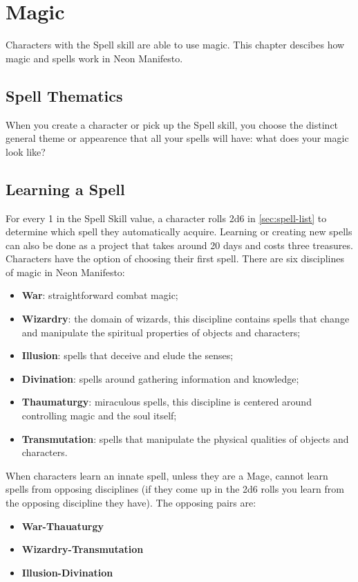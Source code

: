 \newpage
\section{Magic}
\label{sec:magic}

Characters with the Spell skill are able to use magic. This chapter descibes how magic and spells work in Neon Manifesto.

\subsection{Spell Thematics}
When you create a character or pick up the Spell skill, you choose the distinct general theme or appearence that all your spells will have: what does your magic look like?

\subsection{Learning a Spell}
For every 1 in the Spell Skill value, a character rolls 2d6 in \ref{sec:spell-list} to determine which spell they automatically acquire. Learning or creating new spells can also be done as a project that takes around 20 days and costs three treasures. Characters have the option of choosing their first spell. There are six disciplines of magic in Neon Manifesto:
\begin{itemize}
    \item {\textbf{War}: straightforward combat magic;}
    \item {\textbf{Wizardry}: the domain of wizards, this discipline contains spells that change and manipulate the spiritual properties of objects and characters;}
    \item {\textbf{Illusion}: spells that deceive and elude the senses;}
    \item {\textbf{Divination}: spells around gathering information and knowledge;}
    \item {\textbf{Thaumaturgy}: miraculous spells, this discipline is centered around controlling magic and the soul itself;}
    \item {\textbf{Transmutation}: spells that manipulate the physical qualities of objects and characters.}
\end{itemize}
When characters learn an innate spell, unless they are a Mage, cannot learn spells from opposing disciplines (if they come up in the 2d6 rolls you learn from the opposing discipline they have). The opposing pairs are:
\begin{itemize}
    \item {\textbf{War-Thauaturgy}}
    \item {\textbf{Wizardry-Transmutation}}
    \item {\textbf{Illusion-Divination}}
\end{itemize}


